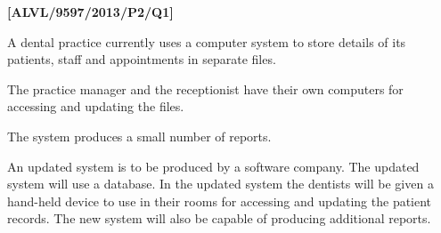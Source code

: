 \item \textbf{{[}ALVL/9597/2013/P2/Q1{]} }

A dental practice currently uses a computer system to store details
of its patients, staff and appointments in separate files.

The practice manager and the receptionist have their own computers
for accessing and updating the files.

The system produces a small number of reports.

An updated system is to be produced by a software company. The updated
system will use a database. In the updated system the dentists will
be given a hand-held device to use in their rooms for accessing and
updating the patient records. The new system will also be capable
of producing additional reports.

